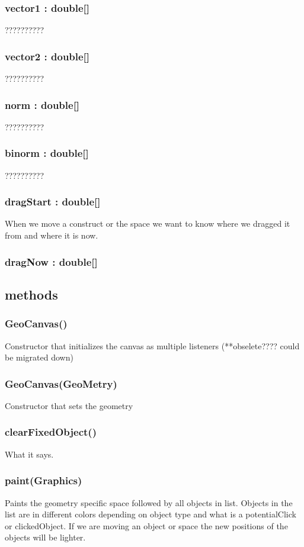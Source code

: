 \documentclass[a4paper,10pt]{report}
\begin{document}
\subsubsection{vector1 : double[]}??????????
\subsubsection{vector2 : double[]}??????????
\subsubsection{norm : double[]}??????????
\subsubsection{binorm : double[]}??????????
\subsubsection{dragStart : double[]}  When we move a construct or the space we want to know where we dragged it from and where it is now.
\subsubsection{dragNow : double[]}
 \subsection{methods}
\subsubsection{GeoCanvas()} Constructor that initializes the canvas as multiple listeners (**obselete???? could be migrated down)
\subsubsection{GeoCanvas(GeoMetry)} Constructor that sets the geometry 
\subsubsection{clearFixedObject()} What it says.
\subsubsection{paint(Graphics)} Paints the geometry specific space followed by all objects in list.  Objects in the list are in different colors depending on object type and what is a potentialClick or clickedObject.  If we are moving an object or space the new positions of the objects will be lighter.
\end{document}
